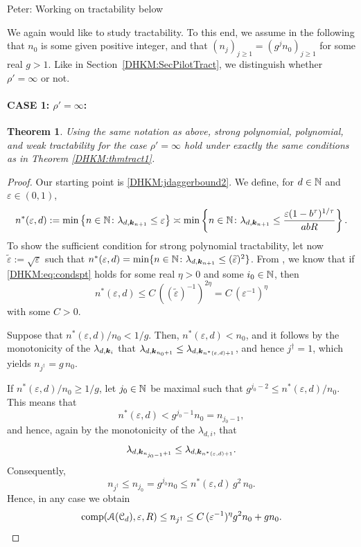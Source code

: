 \documentclass[USenglish]{article}
\theoremstyle{dgthm}
\newtheorem{theorem}{Theorem}
\theoremstyle{dgthm}
\theoremstyle{dgthm}
\theoremstyle{dgthm}
\theoremstyle{dgdef}
\newcommand{\PeterNote}[1]{{\color{orange}Peter: #1}}
\begin{document}
\PeterNote{Working on tractability below

\medskip

We again would like to study tractability. To this end, we assume in the following that $n_0$ is some given positive integer, and that $(n_j)_{j\ge 1}=(g^j n_0)_{j\ge 1}$ for some real $g>1$. Like in Section~\ref{DHKM:SecPilotTract}, we distinguish whether $\rho'=\infty$ or not. 

\paragraph*{CASE 1: $\rho'=\infty$:}

\begin{theorem} \label{DHKM:thmtract3}
Using the same notation as above, strong polynomial, polynomial, and weak tractability for the case $\rho'=\infty$ hold under exactly the 
same conditions as in Theorem \ref{DHKM:thmtract1}.
\end{theorem}
\begin{proof}
Our starting point is \eqref{DHKM:jdaggerbound2}.
 We define, for $d\in{\mathbb{N}}$ and $\varepsilon\in (0,1)$,
 \[
  n^*(\varepsilon,d):=\min\left\{n\in{\mathbb{N}}\colon \lambda_{d,{\boldsymbol{k}}_{n+1}}\leq \varepsilon\right\}\asymp
  \min\left\{n\in{\mathbb{N}}\colon \lambda_{d,{\boldsymbol{k}}_{n+1}}\leq \frac{\varepsilon (1-b^\tau)^{1/\tau}}{abR}\right\}.
 \]
 To show the sufficient condition for strong polynomial tractability, let now $\widetilde{\varepsilon}:=\sqrt{\varepsilon}$ such that $n^*(\varepsilon,d)=\min\{n\in{\mathbb{N}}\colon \lambda_{d,{\boldsymbol{k}}_{n+1}}\leq (\widetilde{\varepsilon})^2 \}$. From \cite{NovWoz08a}, we know that if \eqref{DHKM:eq:condspt} holds for some real $\eta>0$ and some $i_0\in{\mathbb{N}}$, then 
 \[
  n^* (\varepsilon,d) \le C\,((\widetilde{\varepsilon})^{-1})^{2\eta}= C\, (\varepsilon^{-1})^\eta 
 \]
 with some $C>0$.
 
 Suppose that $n^*(\varepsilon,d) /n_0 < 1/g$. Then, $n^*(\varepsilon,d) < n_0$, and it follows by the monotonicity of the $\lambda_{d,{\boldsymbol{k}}_i}$ that
 $\lambda_{d,{\boldsymbol{k}}_{n_0+1}}\leq \lambda_{d,{\boldsymbol{k}}_{n^*(\varepsilon,d)+1}}$, and hence $j^\dagger =1$, which yields $n_{j^\dagger}=g\,n_0$. 
 
 If $n^*(\varepsilon,d) /n_0 \ge 1/g$, let $j_0\in {\mathbb{N}}$ be maximal such that $g^{j_0-2}\le n^*(\varepsilon,d) /n_0$. This means that 
 \[
 n^*(\varepsilon,d)  < g^{j_0-1} n_0=n_{j_0-1},
 \] 
 and hence, again by the monotonicity of the $\lambda_{d,i}$, that 
 \[
 \lambda_{d,{\boldsymbol{k}}_{n_{j_0-1}+1}}\leq \lambda_{d,{\boldsymbol{k}}_{n^*(\varepsilon,d)+1}}.
 \] 
 Consequently, 
 \[
 n_{j^\dagger} \le n_{j_0}=g^{j_0} n_0 \le 
 n^*(\varepsilon,d)\, g^2\,n_0.
 \]
 Hence, in any case we obtain
 \[
  \textup{comp} ({\mathcal{A}} ({\mathcal{C}}_d),\varepsilon,R) \leq n_{j^\dagger} \leq 
  C\, (\varepsilon^{-1})^\eta g^2 n_0+ gn_0.
 \]
 

\end{proof}}
\end{document}
